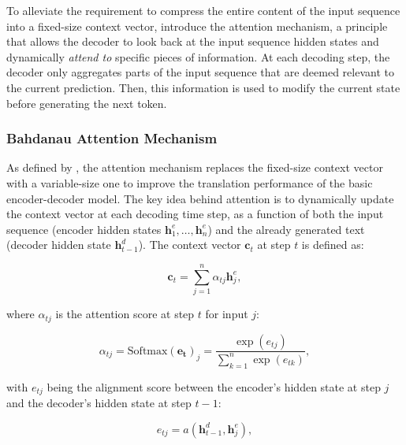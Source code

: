 To alleviate the requirement to compress the entire content of the input sequence into a fixed-size context vector, \citet{bahdanau2014neural} introduce the attention mechanism, a principle that allows the decoder to look back at the input sequence hidden states and dynamically \textit{attend to} specific pieces of information. At each decoding step, the decoder only aggregates parts of the input sequence that are deemed relevant to the current prediction. Then, this information is used to modify the current state before generating the next token. 


\subsubsection{Bahdanau Attention Mechanism}


As defined by \citet{bahdanau2014neural}, the attention mechanism replaces the fixed-size context vector with a variable-size one to improve the translation performance of the basic encoder-decoder model. The key idea behind attention is to dynamically update the context vector at each decoding time step, as a function of both the input sequence (encoder hidden states $\bm{h}^e_1, \ldots, \bm{h}^e_n$) and the already generated text (decoder hidden state $\bm{h}^d_{t-1}$). The context vector $\bm{c}_t$ at step $t$ is defined as:

\begin{equation}
    \bm{c}_t = \sum_{j=1}^n \alpha_{tj} \bm{h}^e_j,
\end{equation}

where $\alpha_{tj}$ is the attention score at step $t$ for input $j$:

\begin{equation}
    \alpha_{tj} = \mathrm{Softmax}(\bm{e_{t}})_j = \frac{\exp(e_{tj})}{\sum_{k=1}^n \exp(e_{tk})},
\end{equation}

with $e_{tj}$ being the alignment score between the encoder's hidden state at step $j$ and the decoder's hidden state at step $t-1$:

\begin{equation}
    e_{tj} = a(\bm{h}^d_{t-1}, \bm{h}^e_j),
\end{equation}

